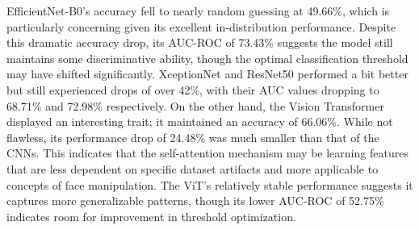 \documentclass[conference]{IEEEtran}
\begin{document}
\begin{table}[htbp]
\caption{Cross-Dataset Evaluation: Celeb-DF $\rightarrow$ FaceForensics++}
\label{tab:cross_dataset}
\centering
{}
\end{table}

EfficientNet-B0's accuracy fell to nearly random guessing at 49.66\%, which is particularly concerning given its excellent in-distribution performance. Despite this dramatic accuracy drop, its AUC-ROC of 73.43\% suggests the model still maintains some discriminative ability, though the optimal classification threshold may have shifted significantly. XceptionNet and ResNet50 performed a bit better but still experienced drops of over 42\%, with their AUC values dropping to 68.71\% and 72.98\% respectively. On the other hand, the Vision Transformer displayed an interesting trait; it maintained an accuracy of 66.06\%. While not flawless, its performance drop of 24.48\% was much smaller than that of the CNNs. This indicates that the self-attention mechanism may be learning features that are less dependent on specific dataset artifacts and more applicable to concepts of face manipulation. The ViT's relatively stable performance suggests it captures more generalizable patterns, though its lower AUC-ROC of 52.75\% indicates room for improvement in threshold optimization.
\end{document}
